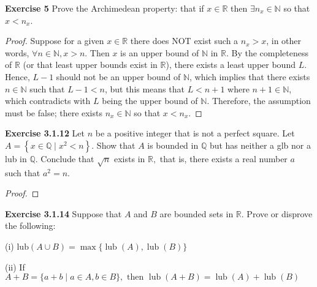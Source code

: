 \documentclass[12pt]{article}
\newcommand{\bbN}{\mathbb{N}}
\newcommand{\bbQ}{\mathbb{Q}}
\newcommand{\bbR}{\mathbb{R}}
\theoremstyle{definition}
\numberwithin{equation}{subsection}
\begin{document}
\textbf{Exercise 5} Prove the Archimedean property: that if
$x \in \bbR$ then $\exists n_x \in \bbN$ so that
$x < n_x$.
\begin{proof}
Suppose for a given $x \in \bbR$ there does NOT exist such a $n_x > x$,
in other words, $\forall n \in \bbN, x > n$. Then $x$ is an upper bound of
$\bbN$ in $\bbR$. By the completeness of $\bbR$ (or that least upper bounds exist in $\bbR$), there exists a least upper bound $L$. Hence, $L - 1$ should not be an upper bound of $\bbN$, which implies that there exists $n \in \bbN$ such that $L-1<n$, but this means that $L < n+1$ where $n+1 \in \bbN$, which contradicts with $L$ being the upper bound of $\bbN$. Therefore, the assumption must be false; there exists $n_x \in \bbN$ so that $x < n_x$.
\end{proof}

\textbf{Exercise 3.1.12} Let $n$ be a positive integer that is not a perfect square.
Let $A=\left\{x \in \mathbb{Q} \mid x^{2}<n\right\} .$ Show that $A$ is bounded in $\bbQ$ but has neither
a glb nor a lub in $\bbQ$. Conclude that $\sqrt{n}$ exists in $\mathbb{R},$ that is, there exists a
real number $a$ such that $a^{2}=n .$
\begin{proof}

\end{proof}


\textbf{Exercise 3.1.14} Suppose that $A$ and $B$ are bounded sets in $\mathbb{R} .$ Prove or
disprove the following:

(i) $\text{lub} (A \cup B)=\max \{\operatorname{lub}(A), \operatorname{lub}(B)\} $

(ii) If $A+B=\{a+b \mid a \in A, b \in B\}, \text { then } \operatorname{lub}(A+B)=\operatorname{lub}(A)+ \operatorname{lub}(B) $
\end{document}
